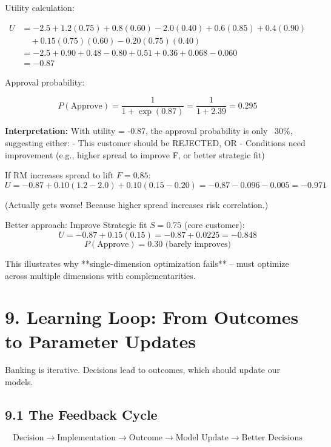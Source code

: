 \documentclass[11pt]{article}
\begin{document}
Utility calculation:

\begin{align*}
U &= -2.5 + 1.2(0.75) + 0.8(0.60) - 2.0(0.40) + 0.6(0.85) + 0.4(0.90) \\
&\quad + 0.15(0.75)(0.60) - 0.20(0.75)(0.40) \\
&= -2.5 + 0.90 + 0.48 - 0.80 + 0.51 + 0.36 + 0.068 - 0.060 \\
&= -0.87
\end{align*}

Approval probability:

\begin{equation}
P(\text{Approve}) = \frac{1}{1 + \exp(0.87)} = \frac{1}{1 + 2.39} = 0.295
\end{equation}

\textbf{Interpretation:} With utility = -0.87, the approval probability is only ~30\%, suggesting either:
- This customer should be REJECTED, OR
- Conditions need improvement (e.g., higher spread to improve F, or better strategic fit)

If RM increases spread to lift $F = 0.85$:
$$U = -0.87 + 0.10(1.2 - 2.0) + 0.10(0.15 - 0.20) = -0.87 - 0.096 - 0.005 = -0.971$$

(Actually gets worse! Because higher spread increases risk correlation.)

Better approach: Improve Strategic fit $S = 0.75$ (core customer):
$$U = -0.87 + 0.15(0.15) = -0.87 + 0.0225 = -0.848$$
$$P(\text{Approve}) = 0.30 \text{ (barely improves)}$$

This illustrates why **single-dimension optimization fails** – must optimize across multiple dimensions with complementarities.

\section{9. Learning Loop: From Outcomes to Parameter Updates}

Banking is iterative. Decisions lead to outcomes, which should update our models.

\subsection{9.1 The Feedback Cycle}

\begin{equation}
\text{Decision} \rightarrow \text{Implementation} \rightarrow \text{Outcome} \rightarrow \text{Model Update} \rightarrow \text{Better Decisions}
\end{equation}
\end{document}
